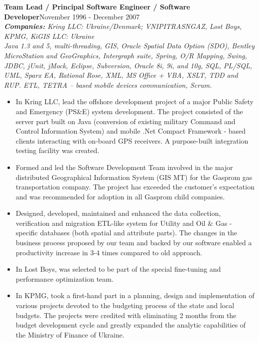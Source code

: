 \documentclass{res}
\newcommand{\aggjobdes}[4]{\needspace{3\baselineskip} %
{\noindent \bf #1\hspace{2ex}}{\hfill #2}\\
{{\noindent \small \textit{ \textbf{ Companies:} {\hfill #3}}}}\\{{\it \small #4.}}}
\begin{document}
\begin{resume}
\aggjobdes {Team Lead / Principal Software Engineer / Software Developer}{November 1996 - December 2007}
{Kring LLC: Ukraine/Denmark; VNIPITRASNGAZ, Lost Boys, KPMG, KiGIS LLC: Ukraine}
{Java 1.3 and 5, multi-threading, GIS, Oracle Spatial Data Option (SDO), Bentley MicroStation and GeoGraphics, Intergraph suite, Spring, O/R Mapping, Swing, JDBC, jUnit, jMock, Eclipse, Subversion, Oracle 8i, 9i, and 10g, SQL, PL/SQL, UML, Sparx EA, Rational Rose, XML, MS Office + VBA, XSLT, TDD and RUP. ETL, TETRA – based mobile devices communication, Scrum}
\begin{itemize} %
 \item In Kring LLC, lead the offshore development project of a major Public Safety and Emergency (PS\&E) system development. The project consisted of the server part built on Java (conversion of existing military Command and Control Information System) and mobile .Net Compact Framework - based clients interacting with on-board GPS receivers. A purpose-built integration testing facility was created.
 \item Formed and led the Software Development Team involved in the major distributed Geographical Information System (GIS MT) for the Gasprom gas transportation company. The project has exceeded the customer’s expectation and was recommended for adoption in all Gasprom child companies.
   \item Designed, developed, maintained and enhanced the data collection, verification and migration ETL-like system for Utility and Oil \& Gas - specific databases (both spatial and attribute parts). The changes in the business process proposed by our team and backed by our software enabled a productivity increase in 3-4 times compared to old approach.
 \item In Lost Boys, was selected to be part of the special fine-tuning and performance optimization team.
 \item In KPMG, took a first-hand part in a planning, design and implementation of various projects devoted to the budgeting process of the state and local budgets.  The projects were credited with eliminating 2 months from the budget development cycle and greatly expanded the analytic capabilities of the Ministry of Finance of Ukraine.
\end{itemize}


\end{resume}
\end{document}
